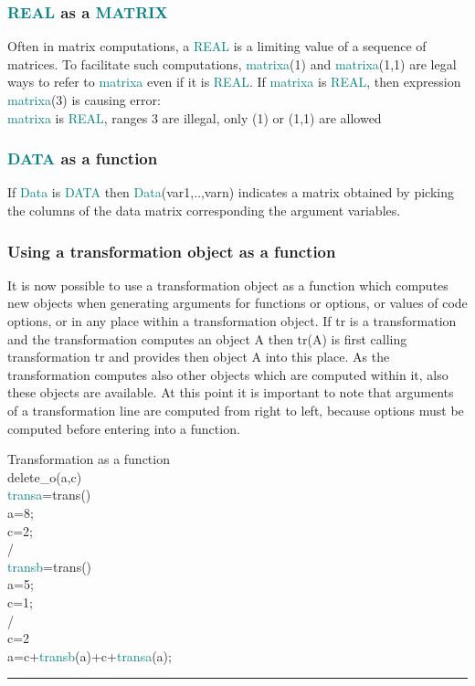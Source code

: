 {\subsubsection{\textcolor{teal}{REAL} as a \textcolor{teal}{MATRIX}} 
\label{realmatrix} 
Often in matrix computations, a \textcolor{teal}{REAL} is a limiting value of a sequence of matrices. 
To facilitate such computations, \textcolor{teal}{matrixa}(1) and \textcolor{teal}{matrixa}(1,1) are legal ways to refer to \textcolor{teal}{matrixa} even if it is \textcolor{teal}{REAL}. 
If \textcolor{teal}{matrixa} is \textcolor{teal}{REAL}, then expression \textcolor{teal}{matrixa}(3) is causing error:\\ 
\textcolor{teal}{matrixa} is \textcolor{teal}{REAL}, ranges            3  are illegal, only (1) or (1,1) are allowed 
\subsubsection{\textcolor{teal}{DATA} as a function} 
\label{datafunc} 
If \textcolor{teal}{Data} is  \textcolor{teal}{DATA} then \textcolor{teal}{Data}(var1,..,varn) indicates a matrix obtained by picking 
the columns of the data matrix corresponding the argument variables. 
\subsubsection{Using a transformation object as a function} 
\label{transfunc} 
It is now possible to use a transformation object as a function which computes new 
objects when generating arguments for functions or options, 
or values of code options, or in any place within a transformation object. 
If {tr} is a transformation and the transformation computes an object {A} then 
{tr(A)} is first calling transformation {tr} and provides then object {A} into this place. 
As the transformation computes also other objects which are computed within it, also these objects 
are available. At this point it is important to note that arguments of 
a transformation line are computed from right to left, because options must be computed before 
entering into a function. 
\singlespacing 
\begin{example}[transfunc]Transformation as a function\\ 
\label{transfunc} 
\noindent \textcolor{VioletRed}{delete\_o}(a,c)\\ 
\textcolor{teal}{transa}=\textcolor{VioletRed}{trans}()\\ 
a=8;\\ 
c=2;\\ 
/   \\ 
\textcolor{teal}{transb}=\textcolor{VioletRed}{trans}()\\ 
a=5;\\ 
c=1;\\ 
/   \\ 
c=2\\ 
a=c+\textcolor{teal}{transb}(a)+c+\textcolor{teal}{transa}(a);\\ 
\end{example} 
\vspace{-7mm} \rule{5cm}{0.1pt} 
\onehalfspacing 
}
